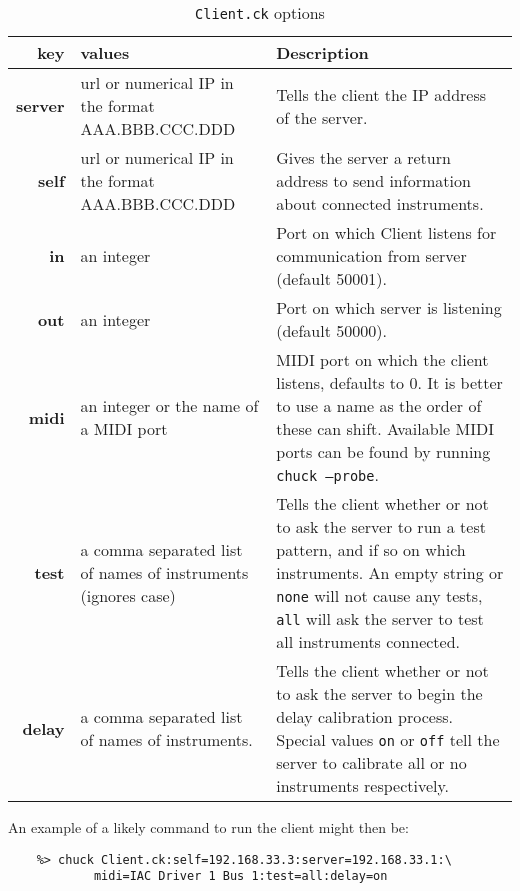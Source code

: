 \documentclass[11pt]{article}
\begin{document}
\begin{table} [ht]
\caption {\texttt{Client.ck} options}
\label{tab:clientopts}
\begin{tabularx} {\textwidth} { | >{\bfseries}r | X | X |}
\hline
key			& values											& Description \\
\hline \hline
server		& url or numerical IP in the format AAA.BBB.CCC.DDD & Tells the client the IP address of the server. \\
\hline
self			& url or numerical IP in the format AAA.BBB.CCC.DDD & Gives the server a return address to send information about connected instruments. \\
\hline
in 			& an integer								    & Port on which Client listens for communication from server (default 50001). \\
\hline
out		         & an integer								    & Port on which server is listening (default 50000). \\
\hline
midi			& an integer or the name of a MIDI port			    & MIDI port on which the client listens, defaults to 0. It is better to use a name as the order
														of these can shift. Available MIDI ports can be found by running \texttt{chuck --probe}. \\
\hline
test			& a comma separated list of names of instruments (ignores case) & Tells the client whether or not to ask the server to run a test pattern, and if so on
														which instruments. An empty string or \texttt{none} will not cause any tests, \texttt{all} will
														ask the server to test all instruments connected. \\
\hline
delay		& a comma separated list of names of instruments. 	& Tells the client whether or not to ask the server to begin the delay calibration process. 
														Special values \texttt{on} or \texttt{off} tell the server to calibrate all or no instruments
														respectively. \\
\hline
\end{tabularx}

\end{table}

An example of a likely command to run the client might then be:
\begin{verbatim}
	%> chuck Client.ck:self=192.168.33.3:server=192.168.33.1:\
			midi=IAC Driver 1 Bus 1:test=all:delay=on
\end{verbatim}

\newpage
\end{document}
